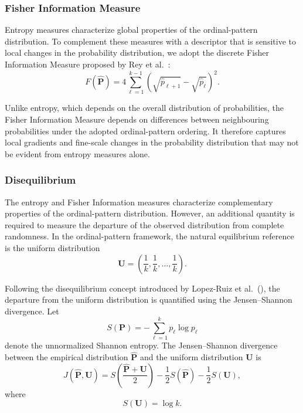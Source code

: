 \documentclass[11pt,a4paper]{article}
\begin{document}
\subsubsection{Fisher Information Measure}

Entropy measures characterize global properties of the ordinal-pattern distribution. To complement these measures with a descriptor that is sensitive to local changes in the probability distribution, we adopt the discrete Fisher Information Measure proposed by Rey et al.~\cite{Rey2024Asymptotic}:
\begin{equation}
	F(\widehat{\mathbf{P}})
	=
	4
	\sum_{\ell=1}^{k-1}
	\left(
	\sqrt{\widehat{p}_{\ell+1}}
	-
	\sqrt{\widehat{p}_{\ell}}
	\right)^2.
\end{equation}

Unlike entropy, which depends on the overall distribution of probabilities, the Fisher Information Measure depends on differences between neighbouring probabilities under the adopted ordinal-pattern ordering. It therefore captures local gradients and fine-scale changes in the probability distribution that may not be evident from entropy measures alone.


\subsubsection{Disequilibrium}
\label{disequilibrium}

The entropy and Fisher Information measures characterize complementary properties of the ordinal-pattern distribution. However, an additional quantity is required to measure the departure of the observed distribution from complete randomness. In the ordinal-pattern framework, the natural equilibrium reference is the uniform distribution
\begin{equation}
	\mathbf{U}
	=
	\left(
	\frac{1}{k},
	\frac{1}{k},
	\ldots,
	\frac{1}{k}
	\right).
\end{equation}

Following the disequilibrium concept introduced by Lopez-Ruiz et al.~(\cite{lopez1995statistical}), the departure from the uniform distribution is quantified using the Jensen--Shannon divergence. Let
\begin{equation}
	S(\mathbf{P})
	=
	-\sum_{\ell=1}^{k}p_\ell\log p_\ell
\end{equation}
denote the unnormalized Shannon entropy. The Jensen--Shannon divergence between the empirical distribution $\widehat{\mathbf{P}}$ and the uniform distribution $\mathbf{U}$ is
\begin{equation}
	J(\widehat{\mathbf{P}},\mathbf{U})
	=
	S\left(
	\frac{\widehat{\mathbf{P}}+\mathbf{U}}{2}
	\right)
	-
	\frac{1}{2}S(\widehat{\mathbf{P}})
	-
	\frac{1}{2}S(\mathbf{U}),
\end{equation}
where
\begin{equation}
	S(\mathbf{U})=\log k.
\end{equation}
\end{document}
